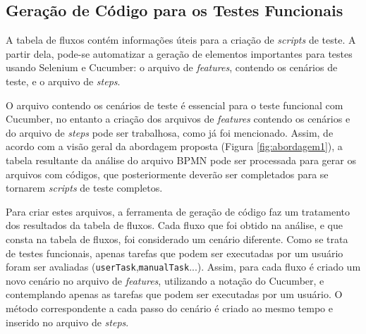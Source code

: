\documentclass[12pt]{article}
\begin{document}


\subsection{Geração de Código para os Testes Funcionais}

A tabela de fluxos contém informações úteis para a criação de \emph{scripts} de teste. A partir dela, pode-se automatizar a geração de elementos importantes para testes usando Selenium e Cucumber: o arquivo de \emph{features},  contendo os cenários de teste, e o arquivo de \emph{steps}.


O arquivo contendo os cenários de teste é essencial para o teste funcional com Cucumber, no entanto a criação dos arquivos de \emph{features} contendo os cenários e do arquivo de \emph{steps} pode ser trabalhosa, como já foi mencionado. Assim, de acordo com a visão geral da abordagem proposta (Figura \ref{fig:abordagem1}), a tabela resultante da análise do arquivo BPMN pode ser processada para gerar os arquivos com códigos, que posteriormente deverão ser completados para se tornarem \emph{scripts} de teste completos. 

Para criar estes arquivos, a ferramenta de geração de código faz um tratamento dos resultados da tabela de fluxos. Cada fluxo que foi obtido na análise, e que consta na tabela de fluxos, foi considerado um cenário diferente. Como se trata de testes funcionais, apenas tarefas que podem ser executadas por um usuário foram ser avaliadas (\texttt{userTask},\texttt{manualTask}...). Assim, para cada fluxo é criado um novo cenário no arquivo de \emph{features}, utilizando a notação do Cucumber, e contemplando apenas as tarefas que podem ser executadas por um usuário. O método correspondente a cada passo do cenário é criado ao mesmo tempo e inserido no arquivo de \emph{steps}. %
\end{document}
